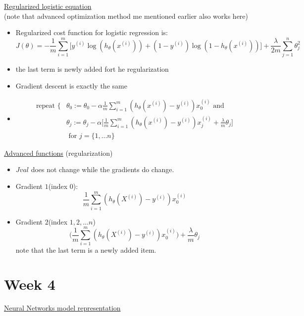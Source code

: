 \documentclass[12pt]{article}
\begin{document}
\underline{Regularized logistic equation} \\
(note that advanced optimization method me mentioned earlier also works here)

\begin{itemize}
	\item Regularized cost function for logistic regression is:
	\[J(\theta) = -\frac{1}{m}\sum_{i=1}^{m} \big[y^{(i)}\log(h_\theta (x^{(i)} ))+ (1-y^{(i)}) \log (1-h_\theta(x^{(i)}))\big] + \frac{\lambda}{2m}\sum_{j=1}^{n}\theta_j^2\] 
	\item the last term is newly added fort he regularization
	\item Gradient descent is exactly the same	\item \begin{align*}
	\text{repeat } \{ &
	\theta_0 := \theta_0 - \alpha\frac{1}{m}\sum_{i=1}^{m} (h_\theta(x^{(i)})-y^{(i)})x_0^{(i)} \text{ and}\\
	&\theta_j := \theta_j - \alpha\big[\frac{1}{m}\sum_{i=1}^{m} (h_\theta(x^{(i)})-y^{(i)})x_j^{(i)} + \frac{\lambda}{m}\theta_j\big] \\ 
	&\text{ for } j = \{1,\ldots n\}	\end{align*}
\end{itemize}

\underline{Advanced functions} (regularization)
\begin{itemize}
	\item $Jval$ does not change while the gradients do change.
	\item Gradient $1$(index $0$):
	\[\frac{1}{m} \sum_{i=1}^{m}(h_\theta(X^{(i)} )- y^{(i)})x_0^{(i)} \]
	\item Gradient $2$(index $1,2,\ldots n$)
	\[\big(   \frac{1}{m} \sum_{i=1}^{m}(h_\theta(X^{(i)} )- y^{(i)})x_0^{(i)}   \big) +\frac{\lambda}{m}\theta_j\] note that the last term is a newly added item.
\end{itemize}

\section*{Week 4}

\underline{Neural Networks model representation}
\end{document}
